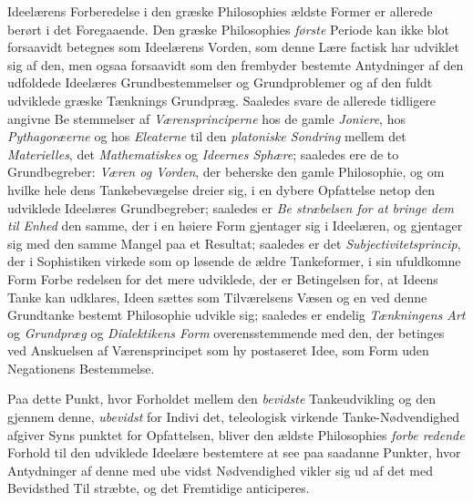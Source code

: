 Ideelærens Forberedelse i den græske Philosophies ældste
Former er allerede berørt i det Foregaaende. Den græske
Philosophies \emph{første} Periode kan ikke blot forsaavidt betegnes
som Ideelærens Vorden, som denne Lære factisk har udviklet
sig af den, men ogsaa forsaavidt som den frembyder bestemte
Antydninger af den udfoldede Ideelæres Grundbestemmelser og
Grundproblemer og af den fuldt udviklede græske Tænknings
 Grundpræg. Saaledes svare de allerede tidligere angivne Be\-%
stemmelser af \emph{Værensprinciperne} hos de gamle \emph{Joniere},
hos \emph{Pythagoræerne} og hos \emph{Eleaterne} til den \emph{platoniske
Sondring} mellem det \emph{Materielles}, det \emph{Mathematiskes} og
\emph{Ideernes Sphære}; saaledes ere de to Grundbegreber: \emph{Væren
og Vorden}, der beherske den gamle Philosophie, og om hvilke
hele dens Tankebevægelse dreier sig, i en dybere Opfattelse
netop den udviklede Ideelæres Grundbegreber; saaledes er \emph{Be\-%
stræbelsen for at bringe dem til Enhed} den samme,
der i en høiere Form gjentager sig i Ideelæren, og gjentager
sig med den samme Mangel paa et Resultat; saaledes er det
\emph{Subjectivitetsprincip}, der i Sophistiken virkede som op\-%
løsende de ældre Tankeformer, i sin ufuldkomne Form Forbe\-%
redelsen for det mere udviklede, der er Betingelsen for, at
Ideens Tanke kan udklares, Ideen sættes som Tilværelsens
Væsen og en ved denne Grundtanke bestemt Philosophie
udvikle sig; saaledes er endelig \emph{Tænkningens Art} og
\emph{Grundpræg} og \emph{Dialektikens Form} overensstemmende med
den, der betinges ved Anskuelsen af Værensprincipet som hy\-%
postaseret Idee, som Form uden Negationens Bestemmelse.

Paa dette Punkt, hvor Forholdet mellem den \emph{bevidste}
Tankeudvikling og den gjennem denne, \emph{ubevidst} for Indivi\-%
det, teleologisk virkende Tanke-Nødvendighed afgiver Syns\-%
punktet for Opfattelsen, bliver den ældste Philosophies \emph{forbe\-%
redende} Forhold til den udviklede Ideelære bestemtere at see
paa saadanne Punkter, hvor Antydninger af denne med ube\-%
vidst Nødvendighed vikler sig ud af det med Bevidsthed Til\-%
stræbte, og det Fremtidige anticiperes.


